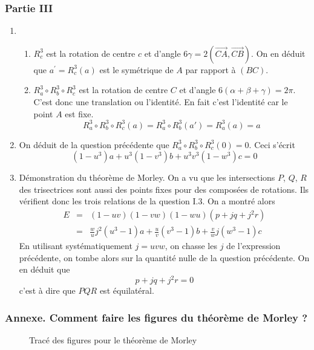 \subsubsection*{Partie III}
\begin{enumerate}
 \item \begin{enumerate}
 \item $R_c^3$ est la rotation de centre $c$ et d'angle $6\gamma=2(\overrightarrow{CA},\overrightarrow{CB})$. On en déduit que $a^\prime=R_c^3(a)$ est le symétrique de $A$ par rapport à $(BC)$.
\item $R_a^3 \circ R_b^3 \circ R_c^3$  est la rotation de centre $C$ et d'angle $6(\alpha +\beta +\gamma)=2\pi$. C'est donc une translation ou l'identité. En fait c'est l'identité car le point $A$ est fixe.
\[R_a^3 \circ R_b^3 \circ R_c^3(a)=R_a^3 \circ R_b^3 (a')=R_a^3(a)=a\]
\end{enumerate}
\item On déduit de la question précédente que $R_a^3 \circ R_b^3 \circ R_c^3(0)=0$. Ceci s'écrit
\[(1-u^3)a+u^3(1-v^3)b+u^3v^3(1-w^3)c=0\]
\item Démonstration du théorème de Morley. On a vu que les intersections $P$, $Q$, $R$ des trisectrices sont aussi des points fixes pour des composées de rotations. Ils vérifient donc les trois relations de la question I.3. On a montré alors
\begin{eqnarray*}
E &=& (1-uv)(1-vw)(1-wu)(p+jq+j^2r)\\
&=&\frac{w}{u}j^2(u^3-1)a+\frac{u}{v}(v^3-1)b+\frac{v}{w}j(w^3-1)c
\end{eqnarray*}
En utilisant systématiquement $j=uvw$, on chasse les $j$ de l'expression précédente, on tombe alors sur la quantité nulle de la question précédente. On en déduit que 
\[p+jq+j^2r=0\]
c'est à dire que $PQR$ est équilatéral.
\end{enumerate}

\subsubsection*{Annexe. Comment faire les figures du théorème de Morley ?}
\begin{figure}[ht]
 \centering
 
 \caption{Tracé des figures pour le théorème de Morley}
 \label{fig:Ctrisec_3}
\end{figure}

